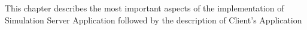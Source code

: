 \documentclass[11pt,english]{article}
\begin{document}
This chapter describes the most important aspects of the implementation of Simulation Server Application followed by the description of Client's Application




\end{document}
